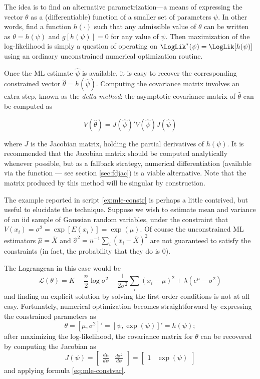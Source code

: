 The idea is to find an alternative parametrization---a means of
expressing the vector $\theta$ as a (differentiable) function of a
smaller set of parameters $\psi$. In other words, find a function
$h(\cdot)$ such that any admissible value of $\theta$ can be written
as $\theta = h(\psi)$ and $g[h(\psi)] = 0$ for any value of
$\psi$. Then maximization of the log-likelihood is simply a question
of operating on $\LogLik^*(\psi) = \LogLik[h(\psi)]$ using an ordinary
unconstrained numerical optimization routine.

Once the ML estimate $\hat{\psi}$ is available, it is easy to recover
the corresponding constrained vector $\hat{\theta} =
h(\hat{\psi})$. Computing the covariance matrix involves an extra
step, known as the \emph{delta method}: the asymptotic covariance
matrix of $\hat{\theta}$ can be computed as

\begin{equation}
  \label{eq:mle-constvar}
  V\left( \hat{\theta} \right) = J(\hat{\psi})' V\left( \hat{\psi}
  \right) J(\hat{\psi})
\end{equation}

where $J$ is the Jacobian matrix, holding the partial derivatives of
$h(\psi)$. It is recommended that the Jacobian matrix should be
computed analytically whenever possible, but as a fallback strategy,
numerical differentiation (available via the function  ---
see section \ref{sec:fdjac}) is a viable alternative. Note that the
matrix produced by this method will be singular by construction.

The example reported in script \ref{ex:mle-constr} is perhaps a little
contrived, but useful to elucidate the technique. Suppose we wish to
estimate mean and variance of an iid sample of Gaussian random
variables, under the constraint that $V(x_i) = \sigma^2 = \exp[E(x_i)]
= \exp(\mu)$. Of course the unconstrained ML estimators $\hat{\mu} =
\bar{X}$ and $\hat{\sigma}^2 = n^{-1} \sum_i (x_i - \bar{X})^2$
are not guaranteed to satisfy the constraints (in fact, the
probability that they do is 0). 

The Lagrangean in this case would be
\[
  \mathcal{L}(\theta) =
  K - \frac{n}{2} \log \sigma^2 - \frac{1}{2 \sigma^2} \sum_i (x_i -
  \mu)^2 + \lambda (e^\mu - \sigma^2)
\]
and finding an explicit solution by solving the first-order conditions
is not at all easy. Fortunately, numerical optimization becomes
straightforward by expressing the constrained parameters as
\[
  \theta = \left[ \mu, \sigma^2 \right]' = [\psi, \exp(\psi)]' =
  h(\psi) ;
\]
after maximizing the log-likelihood, the covariance matrix for
$\theta$ can be recovered by computing the Jacobian as
\[
  J(\psi) =
  \left[ \begin{array}{cc}
      \frac{d \mu}{d \psi} &
           \frac{d \sigma^2}{d \psi} 
  \end{array}\right] =          
  \left[ \begin{array}{cc}
      1 & \exp(\psi)
  \end{array}\right]           
\]
and applying formula \eqref{eq:mle-constvar}.

